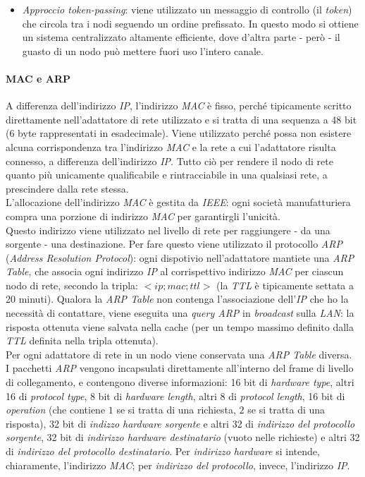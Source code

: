 \begin{itemize}
\begin{itemize}
		\item \textit{Approccio token-passing}: viene utilizzato un messaggio di controllo (il \textit{token}) che circola tra i nodi seguendo un ordine prefissato. In questo modo si ottiene un sistema centralizzato altamente efficiente, dove d'altra parte - però - il guasto di un nodo può mettere fuori uso l'intero canale.
	\end{itemize}
\end{itemize}

\paragraph{MAC e ARP}
A differenza dell'indirizzo \textit{IP}, l'indirizzo \textit{MAC} è fisso, perché tipicamente scritto direttamente nell'adattatore di rete utilizzato e si tratta di una sequenza a 48 bit (6 byte rappresentati in esadecimale). Viene utilizzato perché possa non esistere alcuna corrispondenza tra l'indirizzo \textit{MAC} e la rete a cui l'adattatore risulta connesso, a differenza dell'indirizzo \textit{IP}. Tutto ciò per rendere il nodo di rete quanto più unicamente qualificabile e rintracciabile in una qualsiasi rete, a prescindere dalla rete stessa. \\
L'allocazione dell'indirizzo \textit{MAC} è gestita da \textit{IEEE}: ogni società manufatturiera compra una porzione di indirizzo \textit{MAC} per garantirgli l'unicità. \\
Questo indirizzo viene utilizzato nel livello di rete per raggiungere - da una sorgente - una destinazione. Per fare questo viene utilizzato il protocollo \textit{ARP} (\textit{Address Resolution Protocol}): ogni dispotivio nell'adattatore mantiete una \textit{ARP Table}, che associa ogni indirizzo \textit{IP} al corrispettivo indirizzo \textit{MAC} per ciascun nodo di rete, secondo la tripla: $<ip;mac;ttl>$ (la \textit{TTL} è tipicamente settata a 20 minuti). Qualora la \textit{ARP Table} non contenga l'associazione dell'\textit{IP} che ho la necessità di contattare, viene eseguita una \textit{query ARP} in \textit{broadcast} sulla \textit{LAN}: la risposta ottenuta viene salvata nella cache (per un tempo massimo definito dalla \textit{TTL} definita nella tripla ottenuta). \\
Per ogni adattatore di rete in un nodo viene conservata una \textit{ARP Table} diversa. \\
I pacchetti \textit{ARP} vengono incapsulati direttamente all'interno del frame di livello di collegamento, e contengono diverse informazioni: 16 bit di \textit{hardware type}, altri 16 di \textit{protocol type}, 8 bit di \textit{hardware length}, altri 8 di \textit{protocol length}, 16 bit di \textit{operation} (che contiene $1$ se si tratta di una richiesta, $2$ se si tratta di una risposta), 32 bit di \textit{indizzo hardware sorgente} e altri 32 di \textit{indirizzo del protocollo sorgente}, 32 bit di \textit{indirizzo hardware destinatario} (vuoto nelle richieste) e altri 32 di \textit{indirizzo del protocollo destinatario}. Per \textit{indirizzo hardware} si intende, chiaramente, l'indirizzo \textit{MAC}; per \textit{indirizzo del protocollo}, invece, l'indirizzo \textit{IP}.

